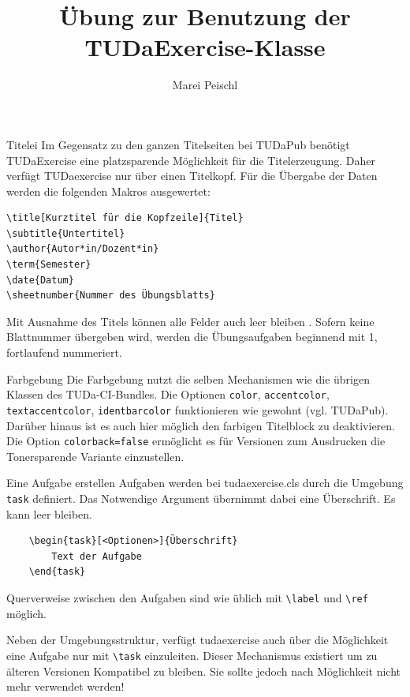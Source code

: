 \documentclass[
	ngerman,
	points=true,%
	]{tudaexercise}
\let\code\texttt
\let\cls\textsf
\let\tbs\textbackslash
\begin{document}
\title[Übung TUDaExercise]{Übung zur Benutzung der TUDaExercise-Klasse}
\author{Marei Peischl}

\maketitle

\begin{task}{Titelei}
Im Gegensatz zu den ganzen Titelseiten bei TUDaPub benötigt TUDaExercise eine platzsparende Möglichkeit für die Titelerzeugung. Daher verfügt TUDaexercise nur über einen Titelkopf. Für die Übergabe der Daten werden die folgenden Makros ausgewertet:
\begin{verbatim}
\title[Kurztitel für die Kopfzeile]{Titel}
\subtitle{Untertitel}
\author{Autor*in/Dozent*in}
\term{Semester}
\date{Datum}
\sheetnumber{Nummer des Übungsblatts}
\end{verbatim}
Mit Ausnahme des Titels können alle Felder auch leer bleiben . Sofern keine Blattnummer übergeben wird, werden die Übungsaufgaben beginnend mit 1, fortlaufend nummeriert.
\end{task}

\begin{task}{Farbgebung}
	Die Farbgebung nutzt die selben Mechanismen wie die übrigen Klassen des TUDa-CI-Bundles. Die Optionen \code{color}, \code{accentcolor}, \code{textaccentcolor}, \code{identbarcolor} funktionieren wie gewohnt (vgl. TUDaPub). Darüber hinaus ist es auch hier möglich den farbigen Titelblock zu deaktivieren. Die Option \code{colorback=false} ermöglicht es für Versionen zum Ausdrucken die Tonersparende Variante einzustellen.
\end{task}

\begin{task}{Eine Aufgabe erstellen}
Aufgaben werden bei \cls{tudaexercise.cls} durch die Umgebung \code{task} definiert. Das Notwendige Argument übernimmt dabei eine Überschrift. Es kann leer bleiben.

\begin{verbatim}
	\begin{task}[<Optionen>]{Überschrift}
		Text der Aufgabe
	\end{task}
\end{verbatim}

Querverweise zwischen den Aufgaben sind wie üblich mit \code{\tbs{}label} und \code{\tbs{}ref} möglich.


\minisec{Die Verwendung des Makros \code{\tbs{}task}}
Neben der Umgebungsstruktur, verfügt \cls{tudaexercise} auch über die Möglichkeit eine Aufgabe nur mit \code{\tbs{}task} einzuleiten. Dieser Mechanismus existiert um zu älteren Versionen Kompatibel zu bleiben. Sie sollte jedoch nach Möglichkeit nicht mehr verwendet werden!

\end{task}
\end{document}
